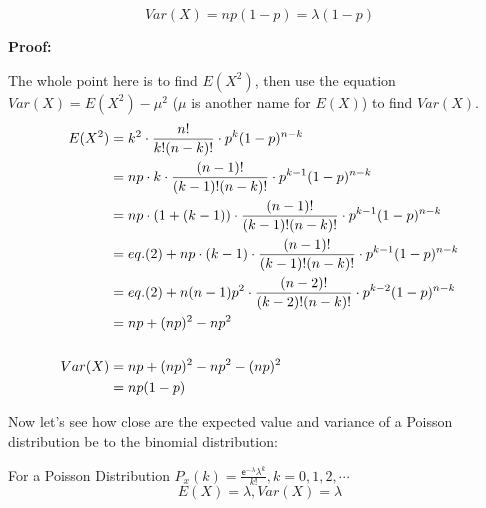 \documentclass[12pt]{article}
\begin{document}
\begin{tcolorbox} [colback=blue!5!white,  colframe=blue!75!black,  title= {\textbf{Lemma 2: Var(X) of a binomial distribution} }]

$$ Var(X) = np(1-p) = \lambda (1-p) $$

\end{tcolorbox}

\textbf{Proof: }



The whole point here is to find $E(X^2)$,  then use the equation $Var(X) = E(X^2) - \mu^2$  ($\mu$ is another name for $ E(X) $) to find $Var(X)$. 
$$
\begin{aligned}[t]
E(X^2) 
    &= k^2 \cdot \frac{n!}{k!(n-k)!} \cdot p^k (1-p)^{n-k} \\
    &= np \cdot k \cdot \frac{(n-1)!}{(k-1)!(n-k)! } \cdot p^{k-1} (1-p)^{n-k} \\
    &= np \cdot (1+ (k-1)) \cdot \frac{(n-1)!}{(k-1)!(n-k)! } \cdot p^{k-1} (1-p)^{n-k} \\
    &= eq.(2) + np \cdot (k-1) \cdot \frac{(n-1)!}{(k-1)!(n-k)! } \cdot p^{k-1} (1-p)^{n-k} \\
    &= eq.(2) + n(n-1)p^2  \cdot \frac{(n-2)!}{(k-2)!(n-k)! } \cdot p^{k-2} (1-p)^{n-k} \\    
    &= np + (np)^2 - np^2 \\
    \\
Var(X)
	&= np + (np)^2 - np^2 - (np)^2 \\
	&= np (1-p) \\
 \end{aligned}\\     
$$

Now let's see how close are the expected value and variance of a Poisson distribution be to the binomial distribution:\\

\begin{tcolorbox} [colback=blue!5!white,  colframe=blue!75!black,  title= {\textbf{Theorem: E(X) and Var(X) of Poisson Distribution} }]
For a Poisson Distribution $\displaystyle P_x (k) = \frac {\mathsf{e}^{-\lambda} \lambda^k } {k!},  k=0,1,2, \cdots$ 
$$
E(X) = \lambda,  Var(X) = \lambda
$$

\end{tcolorbox}
\end{document}
